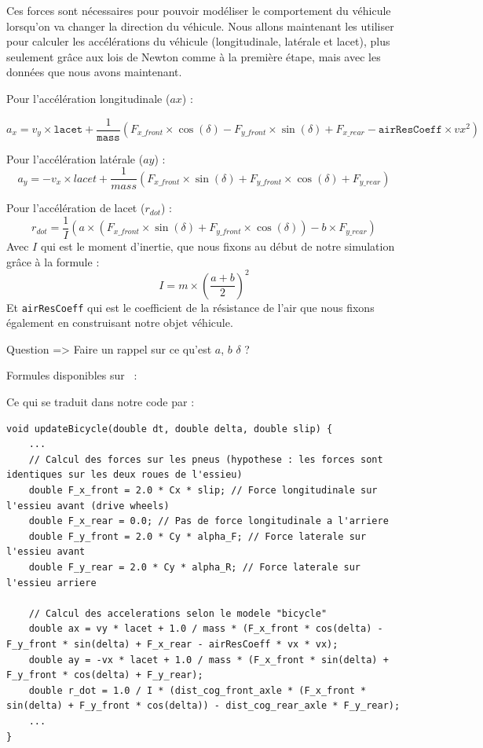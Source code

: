 Ces forces sont nécessaires pour pouvoir modéliser le comportement du véhicule lorsqu'on va changer la direction du véhicule.
Nous allons maintenant les utiliser pour calculer les accélérations du véhicule (longitudinale, latérale et lacet), plus seulement grâce aux lois de Newton comme à la première étape, mais avec les données que nous avons maintenant.

Pour l'accélération longitudinale ($ax$) :


$$a_x = v_y \times \texttt{lacet} + \frac{1}{\texttt{mass}}(F_{x\_front} \times \cos(\delta) - F_{y\_front} \times \sin(\delta) + F_{x\_rear} - \texttt{airResCoeff} \times vx^2)$$

Pour l'accélération latérale ($ay$) :
$$a_y=-v_x\times lacet + \frac{1}{mass}(F_{x\_front} \times \sin(\delta) + F_{y\_front} \times \cos(\delta) + F_{y\_rear})$$

Pour l'accélération de lacet ($r_{dot}$) :
$$r_{dot} = \frac{1}{I}(a \times (F_{x\_front} \times \sin(\delta) + F_{y\_front} \times \cos(\delta)) - b \times F_{y\_rear})$$
Avec $I$ qui est le moment d'inertie, que nous fixons au début de notre simulation grâce à la formule : $$I = m \times ({\frac{{a+b}}{2}})^2$$
Et \texttt{airResCoeff} qui est le coefficient de la résistance de l'air que nous fixons également en construisant notre objet véhicule. \newline

{\Large Question => Faire un rappel sur ce qu'est $a$, $b$ $\delta$ ?}
\begin{center}
Formules disponibles sur ~\cite{VDS_MathWorks}:
\end{center}


Ce qui se traduit dans notre code par :

\begin{lstlisting}[style=CStyle,label={lst:update_bicycle}]
void updateBicycle(double dt, double delta, double slip) {
    ...
    // Calcul des forces sur les pneus (hypothese : les forces sont identiques sur les deux roues de l'essieu)
    double F_x_front = 2.0 * Cx * slip; // Force longitudinale sur l'essieu avant (drive wheels)
    double F_x_rear = 0.0; // Pas de force longitudinale a l'arriere
    double F_y_front = 2.0 * Cy * alpha_F; // Force laterale sur l'essieu avant
    double F_y_rear = 2.0 * Cy * alpha_R; // Force laterale sur l'essieu arriere

    // Calcul des accelerations selon le modele "bicycle"
    double ax = vy * lacet + 1.0 / mass * (F_x_front * cos(delta) - F_y_front * sin(delta) + F_x_rear - airResCoeff * vx * vx);
    double ay = -vx * lacet + 1.0 / mass * (F_x_front * sin(delta) + F_y_front * cos(delta) + F_y_rear);
    double r_dot = 1.0 / I * (dist_cog_front_axle * (F_x_front * sin(delta) + F_y_front * cos(delta)) - dist_cog_rear_axle * F_y_rear);
    ...
}
\end{lstlisting}


